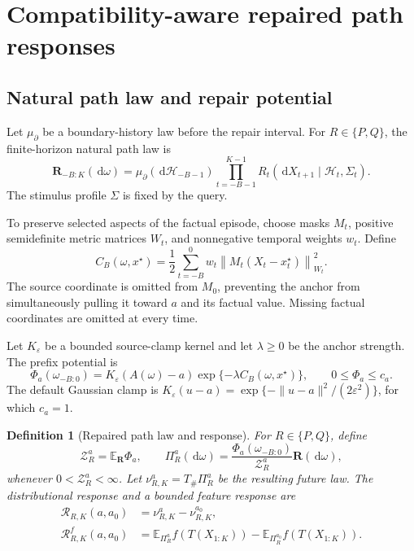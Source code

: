 \documentclass{article}
\newcommand{\E}{\mathbb E}
\newcommand{\Z}{\mathcal Z}
\newcommand{\Hist}{\mathcal H}
\newcommand{\PathR}{\mathbf R}
\newcommand{\eps}{\varepsilon}
\newcommand{\dd}{\,\mathrm d}
\newtheorem{definition}{Definition}
\theoremstyle{remark}
\begin{document}
\section{Compatibility-aware repaired path responses}
\label{sec:estimand}

\subsection{Natural path law and repair potential}

Let \(\mu_\partial\) be a boundary-history law before the repair interval.
For \(R\in\{P,Q\}\), the finite-horizon natural path law is
\begin{equation}
  \PathR_{-B:K}(\dd\omega)
  =
  \mu_\partial(\dd\Hist_{-B-1})
  \prod_{t=-B-1}^{K-1}
  R_t(\dd X_{t+1}\mid \Hist_t,\Sigma_t).
  \label{eq:path-law}
\end{equation}
The stimulus profile \(\Sigma\) is fixed by the query.

To preserve selected aspects of the factual episode, choose masks \(M_t\),
positive semidefinite metric matrices \(W_t\), and nonnegative temporal weights
\(w_t\). Define
\begin{equation}
  C_B(\omega,x^\star)
  =
  \frac12\sum_{t=-B}^{0}
  w_t\left\|M_t(X_t-x_t^\star)\right\|_{W_t}^2.
  \label{eq:anchor-cost}
\end{equation}
The source coordinate is omitted from \(M_0\), preventing the anchor from
simultaneously pulling it toward \(a\) and its factual value. Missing factual
coordinates are omitted at every time.

Let \(K_\eps\) be a bounded source-clamp kernel and let \(\lambda\geq0\) be the
anchor strength. The prefix potential is
\begin{equation}
  \Phi_{a}(\omega_{-B:0})
  =
  K_\eps\!\left(A(\omega)-a\right)
  \exp\{-\lambda C_B(\omega,x^\star)\},
  \qquad 0\leq \Phi_a\leq c_a.
  \label{eq:potential}
\end{equation}
The default Gaussian clamp is
\(K_\eps(u-a)=\exp\{-\|u-a\|^2/(2\eps^2)\}\), for which \(c_a=1\).

\begin{definition}[Repaired path law and response]
\label{def:repaired-law}
For \(R\in\{P,Q\}\), define
\begin{equation}
  \Z_R^a=\E_{\PathR}\Phi_a,\qquad
  \Pi_R^a(\dd\omega)
  =
  \frac{\Phi_a(\omega_{-B:0})}{\Z_R^a}
  \PathR(\dd\omega),
  \label{eq:repaired-law}
\end{equation}
whenever \(0<\Z_R^a<\infty\). Let
\(\nu_{R,K}^a=T_{\#}\Pi_R^a\) be the resulting future law. The
distributional response and a bounded feature response are
\begin{align}
  \mathcal R_{R,K}(a,a_0)
  &=
  \nu_{R,K}^a-\nu_{R,K}^{a_0},
  \label{eq:distributional-response}\\
  \mathcal R_{R,K}^f(a,a_0)
  &=
  \E_{\Pi_R^a}f\!\left(T(X_{1:K})\right)
  -
  \E_{\Pi_R^{a_0}}f\!\left(T(X_{1:K})\right).
  \label{eq:feature-response}
\end{align}
\end{definition}
\end{document}
